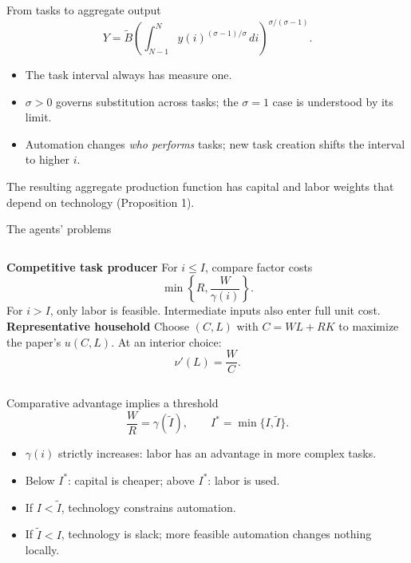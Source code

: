 \documentclass[aspectratio=169,11pt]{beamer}
\begin{document}
\begin{frame}{From tasks to aggregate output}
\[Y=\widetilde B\left(\int_{N-1}^{N}
  y(i)^{(\sigma-1)/\sigma}\,di\right)^{\sigma/(\sigma-1)}.\]
\begin{itemize}
\item The task interval always has measure one.
\item $\sigma>0$ governs substitution across tasks; the $\sigma=1$ case is understood by its limit.
\item Automation changes \emph{who performs} tasks; new task creation shifts the interval to higher $i$.
\end{itemize}
\vspace{.4em}
The resulting aggregate production function has capital and labor weights that depend on technology (Proposition 1).
\end{frame}

\begin{frame}{The agents' problems}
\begin{columns}[T]
\textbf{Competitive task producer}
\vspace{.4em}
For $i\le I$, compare factor costs
\vspace{.3em}
\[\min\left\{R,\frac{W}{\gamma(i)}\right\}.\]
For $i>I$, only labor is feasible. Intermediate inputs also enter full unit cost.
\textbf{Representative household}
\vspace{.4em}
Choose $(C,L)$ with $C=WL+RK$ to maximize the paper's $u(C,L)$. At an interior choice:
\[\nu'(L)=\frac{W}{C}.\]
\end{columns}
\end{frame}

\begin{frame}{Comparative advantage implies a threshold}
\[\frac{W}{R}=\gamma(\widetilde I),\qquad I^*=\min\{I,\widetilde I\}.\]
\begin{itemize}
\item $\gamma(i)$ strictly increases: labor has an advantage in more complex tasks.
\item Below $I^*$: capital is cheaper; above $I^*$: labor is used.
\item If $I<\widetilde I$, technology constrains automation.
\item If $\widetilde I<I$, technology is slack; more feasible automation changes nothing locally.
\end{itemize}
\end{frame}
\end{document}
